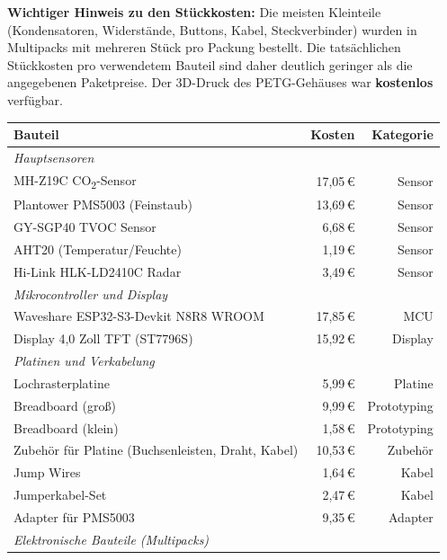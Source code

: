 \textbf{Wichtiger Hinweis zu den Stückkosten:} Die meisten Kleinteile (Kondensatoren, Widerstände, Buttons, Kabel, Steckverbinder) wurden in Multipacks mit mehreren Stück pro Packung bestellt. Die tatsächlichen Stückkosten pro verwendetem Bauteil sind daher deutlich geringer als die angegebenen Paketpreise. Der 3D-Druck des PETG-Gehäuses war \textbf{kostenlos} verfügbar.

\begin{table}[htb]
\centering
\renewcommand{\arraystretch}{1.2}
\label{tab:kosten_detail}
\small
\begin{tabular}{p{7cm} r r}
\toprule
\rowcolor{tableheader}
\textbf{Bauteil} & \textbf{Kosten} & \textbf{Kategorie} \\
\midrule
\multicolumn{3}{l}{\textit{Hauptsensoren}} \\
MH-Z19C CO\textsubscript{2}-Sensor & 17,05\,\euro{} & Sensor \\
Plantower PMS5003 (Feinstaub) & 13,69\,\euro{} & Sensor \\
GY-SGP40 TVOC Sensor & 6,68\,\euro{} & Sensor \\
AHT20 (Temperatur/Feuchte) & 1,19\,\euro{} & Sensor \\
Hi-Link HLK-LD2410C Radar & 3,49\,\euro{} & Sensor \\
\midrule
\multicolumn{3}{l}{\textit{Mikrocontroller und Display}} \\
Waveshare ESP32-S3-Devkit N8R8 WROOM & 17,85\,\euro{} & MCU \\
Display 4,0 Zoll TFT (ST7796S) & 15,92\,\euro{} & Display \\
\midrule
\multicolumn{3}{l}{\textit{Platinen und Verkabelung}} \\
Lochrasterplatine & 5,99\,\euro{} & Platine \\
Breadboard (groß) & 9,99\,\euro{} & Prototyping \\
Breadboard (klein) & 1,58\,\euro{} & Prototyping \\
Zubehör für Platine (Buchsenleisten, Draht, Kabel) & 10,53\,\euro{} & Zubehör \\
Jump Wires & 1,64\,\euro{} & Kabel \\
Jumperkabel-Set & 2,47\,\euro{} & Kabel \\
Adapter für PMS5003 & 9,35\,\euro{} & Adapter \\
\midrule
\multicolumn{3}{l}{\textit{Elektronische Bauteile (Multipacks)}} \\

\end{tabular}
\end{table}
